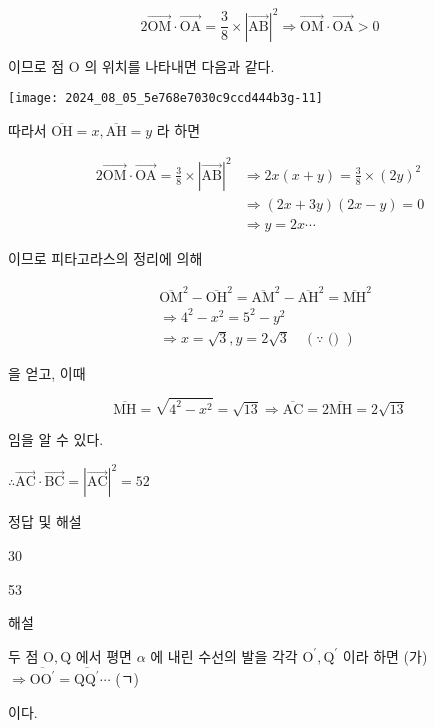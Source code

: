 \documentclass[10pt]{article}
\begin{document}
\[
2 \overrightarrow{\mathrm{OM}} \cdot \overrightarrow{\mathrm{OA}}=\frac{3}{8} \times|\overrightarrow{\mathrm{AB}}|^{2} \Rightarrow \overrightarrow{\mathrm{OM}} \cdot \overrightarrow{\mathrm{OA}}>0
\]

이므로 점 O 의 위치를 나타내면 다음과 같다.

\begin{center}
\texttt{[image: 2024\_08\_05\_5e768e7030c9ccd444b3g-11]}
\end{center}

따라서 \(\overline{\mathrm{OH}}=x, \overline{\mathrm{AH}}=y\) 라 하면

\[
\begin{aligned}
2 \overrightarrow{\mathrm{OM}} \cdot \overrightarrow{\mathrm{OA}}=\frac{3}{8} \times|\overrightarrow{\mathrm{AB}}|^{2} & \Rightarrow 2 x(x+y)=\frac{3}{8} \times(2 y)^{2} \\
& \Rightarrow(2 x+3 y)(2 x-y)=0 \\
& \Rightarrow y=2 x \cdots
\end{aligned}
\]

이므로 피타고라스의 정리에 의해

\[
\begin{aligned}
& \overline{\mathrm{OM}}^{2}-\overline{\mathrm{OH}}^{2}=\overline{\mathrm{AM}}^{2}-\overline{\mathrm{AH}}^{2}=\overline{\mathrm{MH}}^{2} \\
& \Rightarrow 4^{2}-x^{2}=5^{2}-y^{2} \\
& \Rightarrow x=\sqrt{3}, y=2 \sqrt{3} \quad(\because \text { () })
\end{aligned}
\]

을 얻고, 이때

\[
\overline{\mathrm{MH}}=\sqrt{4^{2}-x^{2}}=\sqrt{13} \Rightarrow \overline{\mathrm{AC}}=2 \overline{\mathrm{MH}}=2 \sqrt{13}
\]

임을 알 수 있다.

\(\therefore \overrightarrow{\mathrm{AC}} \cdot \overrightarrow{\mathrm{BC}}=|\overrightarrow{\mathrm{AC}}|^{2}=52\)

정답 및 해설

30

53

해설

두 점 \(\mathrm{O}, \mathrm{Q}\) 에서 평면 \(\alpha\) 에 내린 수선의 발을 각각 \(\mathrm{O}^{\prime}, \mathrm{Q}^{\prime}\) 이라 하면 (가) \(\Rightarrow \overline{\mathrm{OO}^{\prime}}=\overline{\mathrm{QQ}^{\prime}} \cdots\) (ㄱ)

이다.
\end{document}
